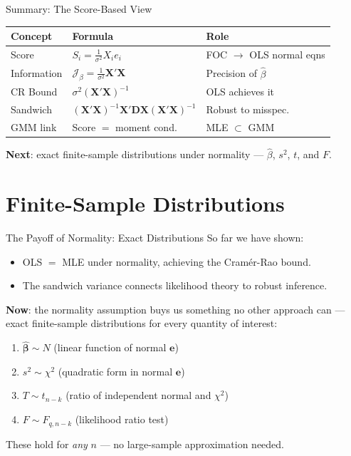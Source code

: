 \documentclass[aspectratio=169, handout, t]{beamer}
\numberwithin{equation}{section}
\begin{document}
\begin{frame}{Summary: The Score-Based View}
\begin{center}
\begin{tabular}{lll}
\toprule
\textbf{Concept} & \textbf{Formula} & \textbf{Role}\\
\midrule
Score & $S_i=\frac{1}{\sigma^2}X_i e_i$ & FOC $\to$ OLS normal eqns\\\pause
Information & $\mathcal{J}_\beta=\frac{1}{\sigma^2}\bm{X'X}$ & Precision of $\hat{\beta}$\\\pause
CR Bound & $\sigma^2(\bm{X'X})^{-1}$ & OLS achieves it\\\pause
Sandwich & $(\bm{X'X})^{-1}\bm{X'DX}(\bm{X'X})^{-1}$ & Robust to misspec.\\\pause
GMM link & Score $=$ moment cond. & MLE $\subset$ GMM\\
\bottomrule
\end{tabular}
\end{center}\pause
\medskip
\textbf{Next}: exact finite-sample distributions under normality --- $\hat{\beta}$, $s^2$, $t$, and $F$.
\end{frame}

\section{Finite-Sample Distributions}

\begin{frame}{The Payoff of Normality: Exact Distributions}
So far we have shown:
\begin{itemize}
\item OLS $=$ MLE under normality, achieving the Cram\'{e}r-Rao bound.
\item The sandwich variance connects likelihood theory to robust inference.
\end{itemize}\pause
\medskip
\textbf{Now}: the normality assumption buys us something no other approach can --- \alert{exact finite-sample distributions} for every quantity of interest:\pause
\begin{enumerate}\setlength{\itemsep}{4pt}
\item $\hat{\bm{\beta}}\sim N$ \hfill (linear function of normal $\bm{e}$)
\item $s^2 \sim \chi^2$ \hfill (quadratic form in normal $\bm{e}$)
\item $T \sim t_{n-k}$ \hfill (ratio of independent normal and $\chi^2$)
\item $F \sim F_{q,n-k}$ \hfill (likelihood ratio test)
\end{enumerate}\pause
\medskip
These hold for \emph{any} $n$ --- no large-sample approximation needed.
\end{frame}
\end{document}
